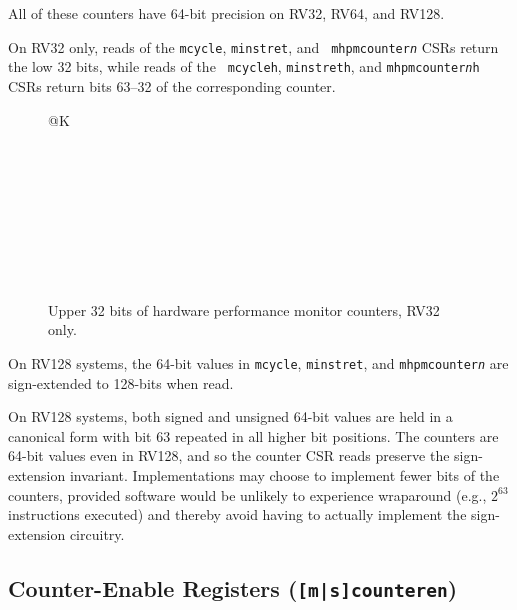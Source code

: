 All of these counters have 64-bit precision on RV32, RV64, and RV128.

On RV32 only, reads of the {\tt mcycle}, {\tt minstret}, and {\tt
mhpmcounter{\em n}} CSRs return the low 32 bits, while reads of the {\tt
mcycleh}, {\tt minstreth}, and {\tt mhpmcounter{\em n}h} CSRs return bits
63--32 of the corresponding counter.

\begin{figure}[h!]
{\footnotesize
\begin{center}
\begin{tabular}{@{}K}
 \\ \hline
{} \\ \hline
{} \\ \hline
{} \\ \hline
{} \\ \hline
{}  \\ \hline
{} \\ \hline
{} \\  \\
\end{tabular}
\end{center}
}
\vspace{-0.1in}
\caption{Upper 32 bits of hardware performance monitor counters, RV32 only.}
\end{figure}

On RV128 systems, the 64-bit values in {\tt mcycle}, {\tt minstret}, and
{\tt mhpmcounter{\em n}} are sign-extended to 128-bits when read.
\begin{samepage-commentary}
On RV128 systems, both signed and unsigned 64-bit values are held in a
canonical form with bit 63 repeated in all higher bit positions.  The
counters are 64-bit values even in RV128, and so the counter CSR reads
preserve the sign-extension invariant.  Implementations may choose to
implement fewer bits of the counters, provided software would be unlikely
to experience wraparound (e.g., $2^{63}$ instructions executed)
and thereby avoid having to actually implement the sign-extension
circuitry.
\end{samepage-commentary}

\subsection{Counter-Enable Registers ({\tt [m|s]counteren})}
\label{sec:mcounteren}

